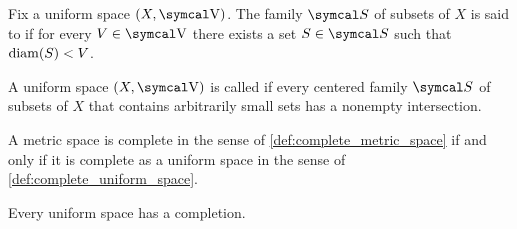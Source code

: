 \begin{definition}\label{def:uniform_space_arbitrarily_small_sets}\cite[446]{Engelking1989}
  Fix a uniform space \( (X, \V) \). The family \( \Cal{S} \) of subsets of \( X \) is said to  if for every \( V \in \V \) there exists a set \( S \in \Cal{S} \) such that \( \operatorname{diam}(S) < V \).
\end{definition}

\begin{definition}\label{def:complete_uniform_space}\cite[446]{Engelking1989}
  A uniform space \( (X, \V) \) is called  if every centered family \( \Cal{S} \) of subsets of \( X \) that contains arbitrarily small sets has a nonempty intersection.
\end{definition}

\begin{proposition}\label{thm:uniform_space_complete_iff_metric_space_complete}
  A metric space is complete in the sense of \cref{def:complete_metric_space} if and only if it is complete as a uniform space in the sense of \cref{def:complete_uniform_space}.
\end{proposition}

\begin{theorem}\label{thm:uniform_space_completion_existence}\cite[theorem 8.3.12]{Engelking1989}
  Every uniform space has a completion.
\end{theorem}

